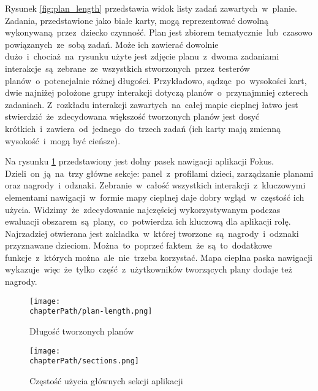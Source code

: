 Rysunek \ref{fig:plan_length} przedstawia widok listy zadań zawartych~w~planie. Zadania, przedstawione jako białe karty, mogą reprezentować dowolną wykonywaną~przez~dziecko czynność. Plan jest zbiorem tematycznie~lub~czasowo powiązanych~ze~sobą zadań. Może ich zawierać dowolnie dużo~i~chociaż~na~rysunku użyte jest zdjęcie planu~z~dwoma zadaniami interakcje~są~zebrane~ze~wszystkich stworzonych~przez~testerów planów~o~potencjalnie różnej długości. Przykładowo, sądząc~po~wysokości kart, dwie najniżej położone grupy interakcji dotyczą planów~o~przynajmniej czterech zadaniach. Z~rozkładu interakcji zawartych~na~całej mapie cieplnej łatwo jest stwierdzić~że~zdecydowana większość tworzonych planów jest dosyć krótkich~i~zawiera~od~jednego~do~trzech zadań (ich karty mają zmienną wysokość~i~mogą być cieńsze).

Na rysunku \ref{fig:sections_usage} przedstawiony jest dolny pasek nawigacji aplikacji Fokus. Dzieli~on~ją~na~trzy główne sekcje: panel~z~profilami dzieci, zarządzanie planami oraz nagrody~i~odznaki. Zebranie~w~całość wszystkich interakcji~z~kluczowymi elementami nawigacji~w~formie mapy cieplnej daje dobry wgląd~w~częstość ich użycia. Widzimy~że~zdecydowanie najczęściej wykorzystywanym podczas ewaluacji obszarem~są~plany,~co~potwierdza ich kluczową dla aplikacji rolę. Najrzadziej otwierana jest zakładka~w~której tworzone~są~nagrody~i~odznaki przyznawane dzieciom. Można~to~poprzeć faktem~że~są~to~dodatkowe funkcje~z~których można~ale~nie~trzeba korzystać. Mapa cieplna paska nawigacji wykazuje~więc~że~tylko~część~z~użytkowników tworzących plany dodaje też nagrody.

\bigskip
\begin{figure}[H]
\centering
\begin{minipage}{.4\textwidth}
	\centering
	\texttt{[image: \\chapterPath/plan-length.png]}
	\bigskip
	\caption{Długość tworzonych planów}
	\label{fig:plan_length}
\end{minipage}
\begin{minipage}{.55\textwidth}
	\centering
	\texttt{[image: \\chapterPath/sections.png]}
	\bigskip
	\caption{Częstość użycia głównych sekcji aplikacji}
	\label{fig:sections_usage}
\end{minipage}
\end{figure}
